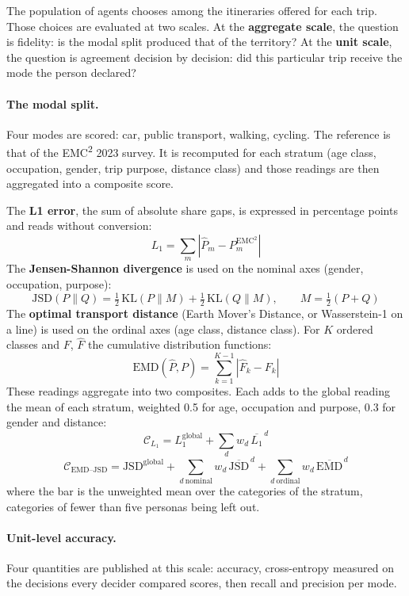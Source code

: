 The population of agents chooses among the itineraries offered for each trip. Those choices are evaluated at two scales. At the \textbf{aggregate scale}, the question is fidelity: is the modal split produced that of the territory? At the \textbf{unit scale}, the question is agreement decision by decision: did this particular trip receive the mode the person declared?

\paragraph{The modal split.} Four modes are scored: car, public transport, walking, cycling. The reference is that of the EMC\textsuperscript{2} 2023 survey. It is recomputed for each stratum (age class, occupation, gender, trip purpose, distance class) and those readings are then aggregated into a composite score.

The \textbf{L1 error}, the sum of absolute share gaps, is expressed in percentage points and reads without conversion:
\[
  L_1 = \sum_{m} \left| \hat{P}_m - P_m^{\text{EMC}^2} \right|
\]
The \textbf{Jensen-Shannon divergence} is used on the nominal axes (gender, occupation, purpose):
\[
  \mathrm{JSD}(P \parallel Q) = \tfrac{1}{2}\,\mathrm{KL}(P \parallel M) + \tfrac{1}{2}\,\mathrm{KL}(Q \parallel M),
  \qquad M = \tfrac{1}{2}(P + Q)
\]
The \textbf{optimal transport distance} (Earth Mover's Distance, or Wasserstein-1 on a line) is used on the ordinal axes (age class, distance class). For $K$ ordered classes and $F$, $\hat{F}$ the cumulative distribution functions:
\[
  \mathrm{EMD}(\hat{P}, P) = \sum_{k=1}^{K-1} \left| \hat{F}_k - F_k \right|
\]
These readings aggregate into two composites. Each adds to the global reading the mean of each stratum, weighted 0.5 for age, occupation and purpose, 0.3 for gender and distance:
\[
  \mathcal{C}_{L_1} = L_1^{\text{global}} + \sum_{d} w_d\,\overline{L_1}^{\,d}
\]
\[
  \mathcal{C}_{\text{EMD--JSD}} = \mathrm{JSD}^{\text{global}}
  + \sum_{d\ \text{nominal}} w_d\,\overline{\mathrm{JSD}}^{\,d}
  + \sum_{d\ \text{ordinal}} w_d\,\overline{\mathrm{EMD}}^{\,d}
\]
where the bar is the unweighted mean over the categories of the stratum, categories of fewer than five personas being left out.

\paragraph{Unit-level accuracy.} Four quantities are published at this scale: accuracy, cross-entropy measured on the decisions every decider compared scores, then recall and precision per mode.

